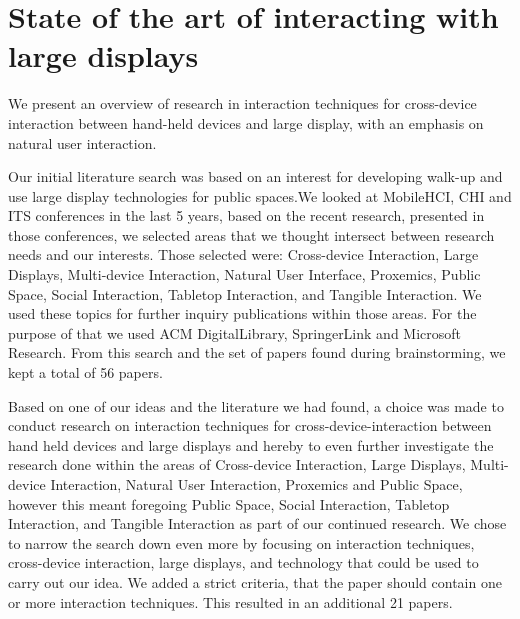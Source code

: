 \section{State of the art of interacting with large displays}
We present an overview of research in interaction techniques for cross-device interaction between hand-held devices and large display, with an emphasis on natural user interaction.

Our initial literature search was based on an interest for developing walk-up and use large display technologies for public spaces.We looked at MobileHCI, CHI and ITS conferences in the last 5 years, based on the recent research, presented in those conferences, we selected areas that we thought intersect between research needs and our interests. Those selected were: Cross-device Interaction, Large Displays, Multi-device Interaction, Natural User Interface, Proxemics, Public Space, Social Interaction, Tabletop Interaction, and Tangible Interaction. We used these topics for further inquiry publications within those areas. For the purpose of that we used ACM DigitalLibrary, SpringerLink and Microsoft Research. From this search and the set of papers found during brainstorming, we kept a total of 56 papers.

Based on one of our ideas and the literature we had found, a choice was made to conduct research on interaction techniques for cross-device-interaction between hand held devices and large displays and hereby to even further investigate the research done within the areas of Cross-device Interaction, Large Displays, Multi-device Interaction, Natural User Interaction, Proxemics and Public Space, however this meant foregoing Public Space, Social Interaction, Tabletop Interaction, and Tangible Interaction as part of our continued research. We chose to narrow the search down even more by focusing on interaction techniques, cross-device interaction, large displays, and technology that could be used to carry out our idea. We added a strict criteria, that the paper should contain one or more interaction techniques. This resulted in an additional 21 papers.

